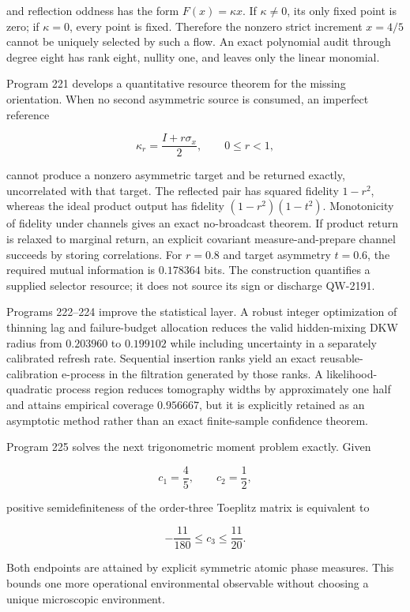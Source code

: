\documentclass[11pt,a4paper,openany]{report}
\begin{document}
and reflection oddness has the form \(F(x)=\kappa x\). If \(\kappa\ne0\), its only fixed point is zero; if \(\kappa=0\), every point is fixed. Therefore the nonzero strict increment \(x=4/5\) cannot be uniquely selected by such a flow. An exact polynomial audit through degree eight has rank eight, nullity one, and leaves only the linear monomial.

Program 221 develops a quantitative resource theorem for the missing orientation. When no second asymmetric source is consumed, an imperfect reference

\[
\kappa_r=\frac{I+r\sigma_x}{2},
\qquad 0\le r<1,
\]

cannot produce a nonzero asymmetric target and be returned exactly, uncorrelated with that target. The reflected pair has squared fidelity \(1-r^2\), whereas the ideal product output has fidelity \((1-r^2)(1-t^2)\). Monotonicity of fidelity under channels gives an exact no-broadcast theorem. If product return is relaxed to marginal return, an explicit covariant measure-and-prepare channel succeeds by storing correlations. For \(r=0.8\) and target asymmetry \(t=0.6\), the required mutual information is \(0.178364\) bits. The construction quantifies a supplied selector resource; it does not source its sign or discharge QW-2191.

Programs 222--224 improve the statistical layer. A robust integer optimization of thinning lag and failure-budget allocation reduces the valid hidden-mixing DKW radius from \(0.203960\) to \(0.199102\) while including uncertainty in a separately calibrated refresh rate. Sequential insertion ranks yield an exact reusable-calibration e-process in the filtration generated by those ranks. A likelihood-quadratic process region reduces tomography widths by approximately one half and attains empirical coverage \(0.956667\), but it is explicitly retained as an asymptotic method rather than an exact finite-sample confidence theorem.

Program 225 solves the next trigonometric moment problem exactly. Given

\[
c_1=\frac45,
\qquad
c_2=\frac12,
\]

positive semidefiniteness of the order-three Toeplitz matrix is equivalent to

\[
-\frac{11}{180}\le c_3\le\frac{11}{20}.
\]

Both endpoints are attained by explicit symmetric atomic phase measures. This bounds one more operational environmental observable without choosing a unique microscopic environment.
\end{document}
